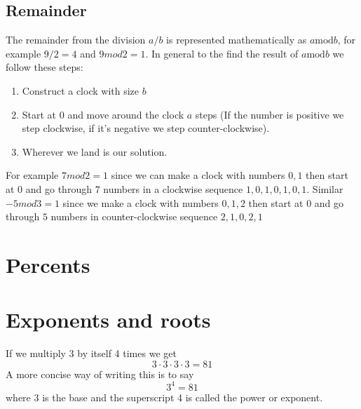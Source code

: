 \subsection{Remainder}
The remainder from the division $a/b$ is represented mathematically as $a \textrm{mod} b$, for example $9/2 = 4$ and $9 mod 2 = 1$. In general to the find the result of $a \textrm{mod} b$ we follow these steps:
\begin{enumerate}
\item Construct a clock with size $b$
\item Start at 0 and move around the clock $a$ steps (If the number is positive we step clockwise, if it's negative we step counter-clockwise).
\item Wherever we land is our solution.
\end{enumerate}
For example $7 mod 2 = 1$ since we can make a clock with numbers $0,1$ then start at $0$ and go through $7$ numbers in a clockwise sequence $1,0,1,0,1,0,1$. Similar $-5 mod 3 = 1$ since we make a clock with numbers $0,1,2$ then start at $0$ and go through $5$ numbers in counter-clockwise sequence  $2,1,0,2,1$

\section{Percents}


\section{Exponents and roots}\label{arit:exp}
If we multiply 3 by itself 4 times we get
\[
3 \cdot 3 \cdot 3 \cdot 3 = 81
\]
A more concise way of writing this is to say
\[
3^4 = 81
\]
where 3 is the base and the superscript 4 is called the power or exponent.


